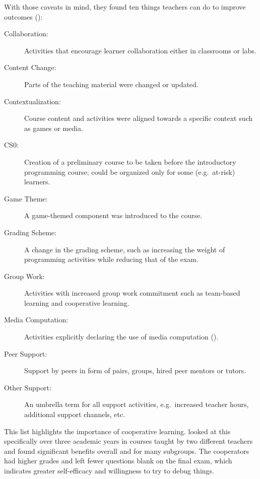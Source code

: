 With those caveats in mind,
they found ten things teachers can do to improve outcomes ():

\begin{description}

\item[Collaboration:]
  Activities that encourage learner collaboration either in classrooms or labs.

\item[Content Change:]
  Parts of the teaching material were changed or updated.

\item[Contextualization:]
  Course content and activities were aligned towards a specific context such as games or media.

\item[CS0:]
  Creation of a preliminary course to be taken before the introductory programming course;
  could be organized only for some (e.g.\ at-risk) learners.

\item[Game Theme:]
  A game-themed component was introduced to the course.

\item[Grading Scheme:]
  A change in the grading scheme,
  such as increasing the weight of programming activities while reducing that of the exam.

\item[Group Work:]
  Activities with increased group work commitment such as team-based learning and cooperative learning.

\item[Media Computation:]
  Activities explicitly declaring the use of media computation ().

\item[Peer Support:]
  Support by peers in form of pairs, groups, hired peer mentors or tutors.

\item[Other Support:]
  An umbrella term for all support activities,
  e.g.\ increased teacher hours, additional support channels, etc.

\end{description}


This list highlights the importance of cooperative learning.
\cite{Beck2013} looked at this specifically over three academic years in courses taught by two different teachers
and found significant benefits overall and for many subgroups.
The cooperators had higher grades
and left fewer questions blank on the final exam,
which indicates greater self-efficacy and willingness to try to debug things.

